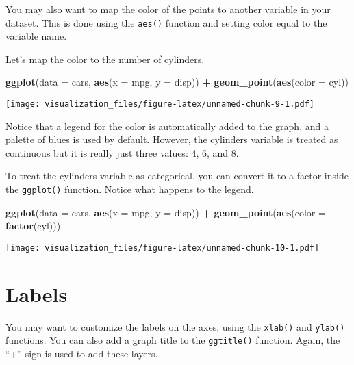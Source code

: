\documentclass[oneside]{memoir}
\newenvironment{Shaded}{\begin{snugshade}}{\end{snugshade}}
\newcommand{\KeywordTok}[1]{\textcolor[rgb]{0.13,0.29,0.53}{\textbf{#1}}}
\newcommand{\DataTypeTok}[1]{\textcolor[rgb]{0.13,0.29,0.53}{#1}}
\newcommand{\StringTok}[1]{\textcolor[rgb]{0.31,0.60,0.02}{#1}}
\newcommand{\OperatorTok}[1]{\textcolor[rgb]{0.81,0.36,0.00}{\textbf{#1}}}
\newcommand{\NormalTok}[1]{#1}
\theoremstyle{definition}
\theoremstyle{definition}
\theoremstyle{definition}
\theoremstyle{remark}
\begin{document}
You may also want to map the color of the points to another variable in
your dataset. This is done using the \texttt{aes()} function and setting
color equal to the variable name.

Let's map the color to the number of cylinders.

\begin{Shaded}
\begin{Highlighting}[]
\KeywordTok{ggplot}\NormalTok{(}\DataTypeTok{data =}\NormalTok{ cars, }\KeywordTok{aes}\NormalTok{(}\DataTypeTok{x =}\NormalTok{ mpg, }\DataTypeTok{y =}\NormalTok{ disp)) }\OperatorTok{+}
\StringTok{  }\KeywordTok{geom_point}\NormalTok{(}\KeywordTok{aes}\NormalTok{(}\DataTypeTok{color =}\NormalTok{ cyl))}
\end{Highlighting}
\end{Shaded}

\texttt{[image: visualization\_files/figure-latex/unnamed-chunk-9-1.pdf]}

Notice that a legend for the color is automatically added to the graph,
and a palette of blues is used by default. However, the cylinders
variable is treated as continuous but it is really just three values: 4,
6, and 8.

To treat the cylinders variable as categorical, you can convert it to a
factor inside the \texttt{ggplot()} function. Notice what happens to the
legend.

\begin{Shaded}
\begin{Highlighting}[]
\KeywordTok{ggplot}\NormalTok{(}\DataTypeTok{data =}\NormalTok{ cars, }\KeywordTok{aes}\NormalTok{(}\DataTypeTok{x =}\NormalTok{ mpg, }\DataTypeTok{y =}\NormalTok{ disp)) }\OperatorTok{+}
\StringTok{  }\KeywordTok{geom_point}\NormalTok{(}\KeywordTok{aes}\NormalTok{(}\DataTypeTok{color =} \KeywordTok{factor}\NormalTok{(cyl)))}
\end{Highlighting}
\end{Shaded}

\texttt{[image: visualization\_files/figure-latex/unnamed-chunk-10-1.pdf]}

\section{Labels}\label{labels}

You may want to customize the labels on the axes, using the
\texttt{xlab()} and \texttt{ylab()} functions. You can also add a graph
title to the \texttt{ggtitle()} function. Again, the ``+'' sign is used
to add these layers.
\end{document}
